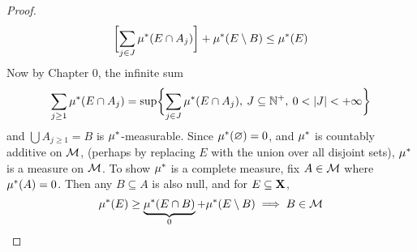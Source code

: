 \documentclass[../../main.tex]{subfiles}
\begin{document}
\begin{proof}
    \[
        \biggl[ \sum_{j\in J}\mu^*(E\cap A_j) \biggr] + \mu^*(E\setminus B)\leq \mu^*(E)
    \]
    Now by Chapter 0, the infinite sum 
    \[
        \sum_{j\geq 1}\mustar(E\cap A_j) = \sup\bigset{\sum_{j\in J} \mustar(E\cap A_j),\: J\subseteq\nat^+,\: 0<|J|<+\infty}
    \]
    and $\bigcup A_{j\geq 1} = B$ is $\mu^*$-measurable. Since $\mu^*(\varnothing) = 0$, and $\mu^*$ is countably additive on $\mathcal{M}$, (perhaps by replacing $E$ with the union over all disjoint sets), $\mu^*$ is a measure on $\mathcal{M}$. To show $\mu^*$ is a complete measure, fix $A\in\mathcal{M}$ where $\mu^*(A) = 0$. Then any $B\subseteq A$ is also null, and for $E\subseteq{\mathbf{X}}$,
    \[
        \mu^*(E) \geq \underbrace{\mu^*(E\cap B)}_{0} + \mu^*(E\setminus B)\implies B\in\mathcal{M}
    \]
        

\end{proof}
\end{document}
